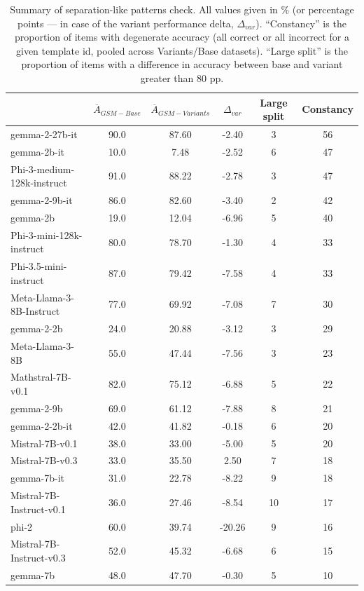 \documentclass[11pt]{article}
\begin{document}
\begin{table}[H]
\centering
\small
\begin{tabular}{lccccc}
\toprule
 & $\overline{A}_{GSM-Base}$ & $\overline{A}_{GSM-Variants}$ & $\Delta_{var}$ & Large split & Constancy \\
\midrule
gemma-2-27b-it & 90.0 & 87.60 & -2.40 & 3 & 56 \\
gemma-2b-it & 10.0 & 7.48 & -2.52 & 6 & 47 \\
Phi-3-medium-128k-instruct & 91.0 & 88.22 & -2.78 & 3 & 47 \\
gemma-2-9b-it & 86.0 & 82.60 & -3.40 & 2 & 42 \\
gemma-2b & 19.0 & 12.04 & -6.96 & 5 & 40 \\
Phi-3-mini-128k-instruct & 80.0 & 78.70 & -1.30 & 4 & 33 \\
Phi-3.5-mini-instruct & 87.0 & 79.42 & -7.58 & 4 & 33 \\
Meta-Llama-3-8B-Instruct & 77.0 & 69.92 & -7.08 & 7 & 30 \\
gemma-2-2b & 24.0 & 20.88 & -3.12 & 3 & 29 \\
Meta-Llama-3-8B & 55.0 & 47.44 & -7.56 & 3 & 23 \\
Mathstral-7B-v0.1 & 82.0 & 75.12 & -6.88 & 5 & 22 \\
gemma-2-9b & 69.0 & 61.12 & -7.88 & 8 & 21 \\
gemma-2-2b-it & 42.0 & 41.82 & -0.18 & 6 & 20 \\
Mistral-7B-v0.1 & 38.0 & 33.00 & -5.00 & 5 & 20 \\
Mistral-7B-v0.3 & 33.0 & 35.50 & 2.50 & 7 & 18 \\
gemma-7b-it & 31.0 & 22.78 & -8.22 & 9 & 18 \\
Mistral-7B-Instruct-v0.1 & 36.0 & 27.46 & -8.54 & 10 & 17 \\
phi-2 & 60.0 & 39.74 & -20.26 & 9 & 16 \\
Mistral-7B-Instruct-v0.3 & 52.0 & 45.32 & -6.68 & 6 & 15 \\
gemma-7b & 48.0 & 47.70 & -0.30 & 5 & 10 \\
\bottomrule
\end{tabular}
\caption{Summary of separation-like patterns check. All values given in \% (or percentage points --- in case of the variant performance delta, $\Delta_{var}$). ``Constancy'' is the proportion of items with degenerate accuracy (all correct or all incorrect for a given template id, pooled across Variants/Base datasets). ``Large split'' is the proportion of items with a difference in accuracy between base and variant greater than 80 pp.}
\label{tab:separation-check}
\end{table}
\end{document}
